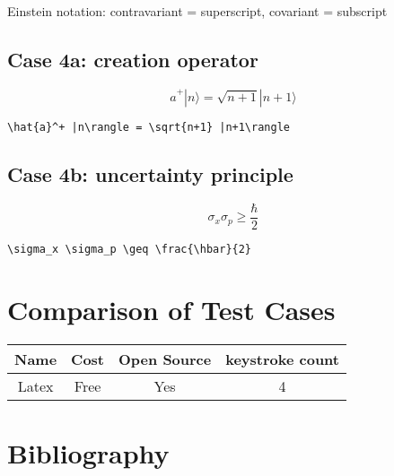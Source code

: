 \documentclass{article}
\begin{document}
\begin{multicols}{2}
Einstein notation: contravariant = superscript, covariant = subscript

\subsection{Case 4a: creation operator}
\begin{equation}
\hat{a}^+ |n\rangle = \sqrt{n+1} |n+1\rangle
\end{equation}

\begin{verbatim}
\hat{a}^+ |n\rangle = \sqrt{n+1} |n+1\rangle
\end{verbatim}

\subsection{Case 4b: uncertainty principle}
\begin{equation}
\sigma_x \sigma_p \geq \frac{\hbar}{2}
\end{equation}

\begin{verbatim}
\sigma_x \sigma_p \geq \frac{\hbar}{2}
\end{verbatim}

\section{Comparison of Test Cases}

\begin{tabular}{|c|c|c|c|}\hline
Name & Cost & Open Source & keystroke count \\\hline
Latex & Free & Yes & 4 \\\hline
\end{tabular}

\section{Bibliography}


\end{multicols}
\end{document}
